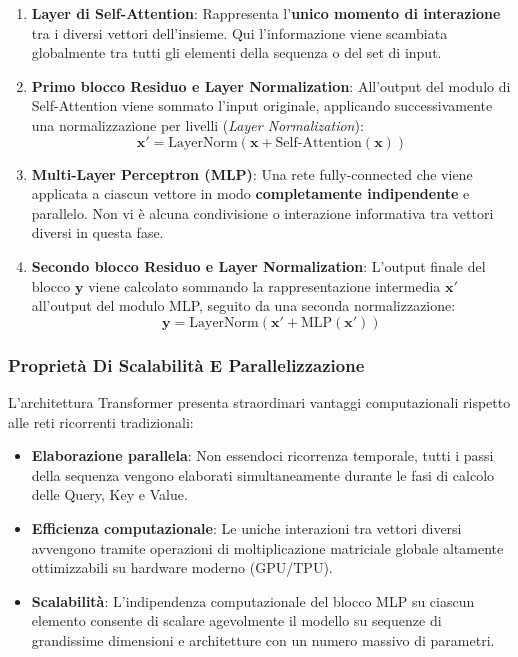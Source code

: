 ﻿\documentclass[11pt, a4paper]{article}
\begin{document}
\begin{enumerate}
    \item \textbf{Layer di Self-Attention}: Rappresenta l'\textbf{unico momento di interazione} tra i diversi vettori dell'insieme. Qui l'informazione viene scambiata globalmente tra tutti gli elementi della sequenza o del set di input.
    \item \textbf{Primo blocco Residuo e Layer Normalization}: All'output del modulo di Self-Attention viene sommato l'input originale, applicando successivamente una normalizzazione per livelli (\emph{Layer Normalization}):
    \[ \bm{x}' = \text{LayerNorm}(\bm{x} + \text{Self-Attention}(\bm{x})) \]
    \item \textbf{Multi-Layer Perceptron (MLP)}: Una rete fully-connected che viene applicata a ciascun vettore in modo \textbf{completamente indipendente} e parallelo. Non vi è alcuna condivisione o interazione informativa tra vettori diversi in questa fase.
    \item \textbf{Secondo blocco Residuo e Layer Normalization}: L'output finale del blocco $\bm{y}$ viene calcolato sommando la rappresentazione intermedia $\bm{x}'$ all'output del modulo MLP, seguito da una seconda normalizzazione:
    \[ \bm{y} = \text{LayerNorm}(\bm{x}' + \text{MLP}(\bm{x}')) \]
\end{enumerate}

\subsubsection{Proprietà Di Scalabilità E Parallelizzazione}

L'architettura Transformer presenta straordinari vantaggi computazionali rispetto alle reti ricorrenti tradizionali:
\begin{itemize}
    \item \textbf{Elaborazione parallela}: Non essendoci ricorrenza temporale, tutti i passi della sequenza vengono elaborati simultaneamente durante le fasi di calcolo delle Query, Key e Value.
    \item \textbf{Efficienza computazionale}: Le uniche interazioni tra vettori diversi avvengono tramite operazioni di moltiplicazione matriciale globale altamente ottimizzabili su hardware moderno (GPU/TPU).
    \item \textbf{Scalabilità}: L'indipendenza computazionale del blocco MLP su ciascun elemento consente di scalare agevolmente il modello su sequenze di grandissime dimensioni e architetture con un numero massivo di parametri.
\end{itemize}
\end{document}
